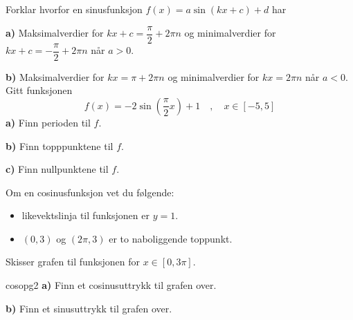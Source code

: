 Forklar hvorfor en sinusfunksjon $ f(x)=a\sin(kx+c)+d $ har\os

\textbf{a)} Maksimalverdier for $ kx+c=\dfrac{\pi}{2}+ 2\pi n$ og minimalverdier for $ kx+c= -\dfrac{\pi}{2} + 2\pi n $ når $ a>0 $.\os

\textbf{b)} Maksimalverdier for $ kx= \pi+2\pi n$ og minimalverdier for $ kx= 2\pi n $ når $ a<0 $. 
\newpage
{}
Gitt funksjonen 
\[ f(x)=-2\sin\left(\frac{\pi}{2}x\right)+1 \quad, \quad x\in[-5, 5]\]
\textbf{a)} Finn perioden til $ f $.\os

\textbf{b)} Finn topppunktene til $ f $. \os

\textbf{c)} Finn nullpunktene til $ f $.\os

Om en cosinusfunksjon vet du følgende:
\begin{itemize}
	\item likevektslinja til funksjonen er $ y=1 $.
	\item $ (0,3) $ og $ (2\pi, 3) $ er to naboliggende toppunkt.
\end{itemize}
Skisser grafen til funksjonen for ${ x\in[0, 3\pi]} $.

\vspace{-10 pt}
{cosopg2}
\vs
\textbf{a)} Finn et cosinusuttrykk til grafen over.\os

\textbf{b)} Finn et sinusuttrykk til grafen over.


